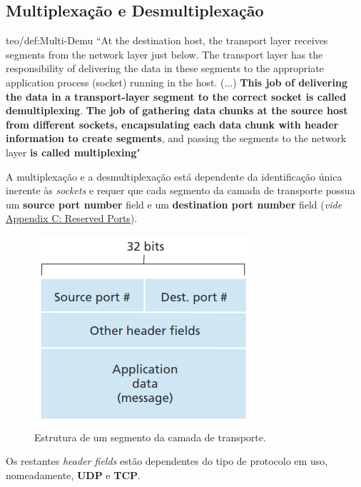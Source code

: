 \subsection[3.2 Multiplexação e Desmultiplexaçãol]{\hspace*{0.075 em}\raisebox{0.2 em}{$\pmb{\drsh}$} Multiplexação e Desmultiplexação}
\label{subsec:multiplex-demultiplex}


\begin{theo}{teo/def:Multi-Demu}\label{def:Multi-Demu}
    ``At the destination host, the transport layer receives segments from the network layer just below. The transport layer has the responsibility of delivering the data in these segments to the appropriate application process (socket) running in the host. (...) \textbf{This job of delivering the data in a transport-layer segment to the correct socket is called} \textbf{demultiplexing}. \textbf{The job of gathering data chunks at the source host from different sockets, encapsulating each data chunk with header information to create segments}, and passing the segments to the network layer \textbf{is called multiplexing}" 
\end{theo}

\noindent A multiplexação e a desmultiplexação está dependente da identificação única inerente às \textit{sockets} e requer que cada segmento da camada de transporte possua um \textbf{source port number} field e um \textbf{destination port number} field (\textit{vide} \hyperref[appendixB]{Appendix C: Reserved Ports}).

\begin{figure}[H]
    \centering
    \includegraphics[width = 0.45\linewidth]{img/3/segment.png}
    \caption{Estrutura de um segmento da camada de transporte.\protect\cite{Kurose2017}}
    \label{fig:segment}
\end{figure}

\noindent Os restantes \textit{header fields} estão dependentes do tipo de protocolo em uso, nomeadamente, \textbf{UDP} e \textbf{TCP}.

